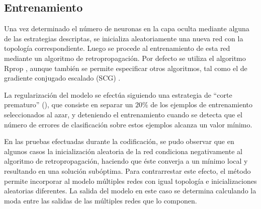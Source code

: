 %
\subsection{Entrenamiento}
%
Una vez determinado el número de neuronas en la capa oculta mediante
alguna de las estrategias descriptas, se inicializa aleatoriamente una
nueva red con la topología correspondiente.
Luego se procede al entrenamiento de esta red mediante un algoritmo de
retropropagación.
Por defecto se utiliza el algoritmo {Rprop} \cite{rprop}, aunque
también se permite especificar otros algoritmos, tal como el de
gradiente conjugado escalado (SCG) \cite{scg}.

La regularización del modelo se efectúa siguiendo una estrategia de
``corte prematuro'' (), que consiste en separar un
$20\%$ de los ejemplos de entrenamiento seleccionados al azar, y
deteniendo el entrenamiento cuando se detecta que el número de errores
de clasificación sobre estos ejemplos alcanza un valor mínimo.

En las pruebas efectuadas durante la codificación, se pudo observar
que en algunos casos la inicialización aleatoria de la red condiciona
negativamente al algoritmo de retropropagación, haciendo que éste
converja a un mínimo local y resultando en una solución subóptima.
Para contrarrestar este efecto, el método permite incorporar al modelo
múltiples redes con igual topología e inicializaciones aleatorias
diferentes.
La salida del modelo en este caso se determina calculando la moda
entre las salidas de las múltiples redes que lo componen.
